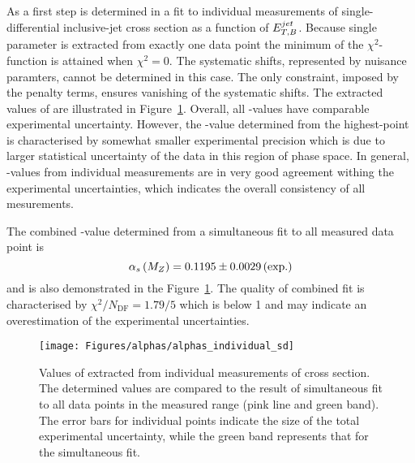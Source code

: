 As a first step \asz is determined in a fit to individual measurements of single-differential inclusive-jet cross section as a function of $\mbox{$E_{T,B}^{jet}$}$. Because single parameter is extracted from exactly one data point the minimum of the $\chi^2$-function is attained when $\chi^2=0$. The systematic shifts, represented by nuisance paramters, cannot be determined in this case. The only constraint, imposed by the penalty terms, ensures vanishing of the systematic shifts. The extracted values of \asz are illustrated in Figure~\ref{fig:alphassinglediffindividual}. Overall, all \as-values have comparable experimental uncertainty. However, the \as-value determined from the highest-\etjetb point is characterised by somewhat smaller experimental precision which is due to larger statistical uncertainty of the data in this region of phase space. In general, \as-values from individual measurements are in very good agreement withing the experimental uncertainties, which indicates the overall consistency of all mesurements.

The combined \asz-value determined from a simultaneous fit to all measured data point is
\begin{equation}
 \asz = 0.1195 \pm 0.0029 \left( \text{exp.} \right) %
 \label{eq:assingledifval}
\end{equation}
and is also demonstrated in the Figure~\ref{fig:alphassinglediffindividual}. The quality of combined fit is characterised by $\chi^2/N_\text{DF}=1.79/5$ which is below 1 and may indicate an overestimation of the experimental uncertainties.

\begin{figure}[tp]
 \begin{center}
 \texttt{[image: Figures/alphas/alphas\_individual\_sd]}
\end{center}
 \caption{Values of \asz extracted from individual measurements of \dsdetjetb cross section. The determined values are compared to the result of simultaneous fit to all data points in the measured \etjetb range (pink line and green band). The error bars for individual points indicate the size of the total experimental uncertainty, while the green band represents that for the simultaneous fit.}
 \label{fig:alphassinglediffindividual}
\end{figure}

